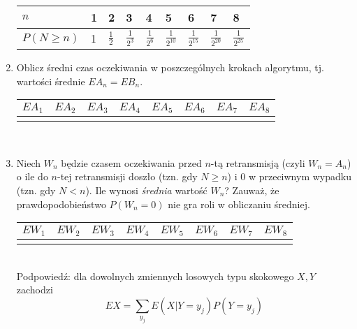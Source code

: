 \documentclass[twoside]{mwart}
\newcommand{\ans}[1]{}
\newcommand{\ans}[1]{\par\emph{Odpowiedź:} #1}
\begin{document}
\begin{enumerate}
{\begin{tabular}{l|p{1.3cm}|p{1.3cm}|p{1.3cm}|p{1.3cm}|p{1.3cm}|p{1.3cm}|p{1.3cm}|p{1.3cm}}
		$n$ & 1 & 2 & 3 & 4 & 5 & 6 & 7 & 8 \\
		\hline
		$P(N\geq n)$ & 1 & $\frac{1}{2}$ & $\frac{1}{2^3}$ & $\frac{1}{2^6}$ & $\frac{1}{2^{10}}$ & $\frac{1}{2^{15}}$ & $\frac{1}{2^{20}}$ & $\frac{1}{2^{25}}$ 
	\end{tabular}
}
\item Oblicz średni czas oczekiwania w poszczególnych krokach algorytmu, tj. wartości średnie $EA_n=EB_n$.
\begin{tabular}{p{1.3cm}|p{1.3cm}|p{1.3cm}|p{1.3cm}|p{1.3cm}|p{1.3cm}|p{1.3cm}|p{1.3cm}}
	$EA_1$ & $EA_2$ & $EA_3$ & $EA_4$ & $EA_5$ & $EA_6$ & $EA_7$ & $EA_8$ \\
	\hline
	& & & & & & & 
\end{tabular}
\vspace{1cm}\\
\ans{\\
	\begin{tabular}{p{1.3cm}|p{1.3cm}|p{1.3cm}|p{1.3cm}|p{1.3cm}|p{1.3cm}|p{1.3cm}|p{1.3cm}}
		$EA_1$ & $EA_2$ & $EA_3$ & $EA_4$ & $EA_5$ & $EA_6$ & $EA_7$ & $EA_8$ \\
		\hline
		$\frac{1}{2}$ & $\frac{3}{2}$ & $\frac{7}{2}$ & $\frac{15}{2}$ & $\frac{31}{2}$ & $\frac{31}{2}$ & $\frac{31}{2}$ & $\frac{31}{2}$ 
	\end{tabular}
}
\item Niech $W_n$ będzie czasem oczekiwania przed $n$-tą retransmisją (czyli $W_n=A_n$) o ile do $n$-tej retransmisji doszło (tzn. gdy $N\geq n$) i $0$ w przeciwnym wypadku (tzn. gdy $N<n$).
Ile wynosi \emph{średnia} wartość $W_n$?
Zauważ, że prawdopodobieństwo $P(W_n=0)$ nie gra roli w obliczaniu średniej.\\
\begin{tabular}{p{1.3cm}|p{1.3cm}|p{1.3cm}|p{1.3cm}|p{1.3cm}|p{1.3cm}|p{1.3cm}|p{1.3cm}}
$EW_1$ & $EW_2$ & $EW_3$ & $EW_4$ & $EW_5$ & $EW_6$ & $EW_7$ & $EW_8$ \\
\hline
 & & & & & & & 
\end{tabular}
\vspace{1cm}\\
Podpowiedź: dla dowolnych zmiennych losowych typu skokowego $X, Y$ zachodzi 
\[EX = \sum_{y_j} E\left(X|Y=y_j\right)P(Y=y_j) \]
\ans{\\
	\[ EW_n = E(W_n|N\geq n)P(N\geq n) + E(W_n|N<n)P(N<n) = EA_nP(N\geq n)\]
	\begin{tabular}{p{1.3cm}|p{1.3cm}|p{1.3cm}|p{1.3cm}|p{1.3cm}|p{1.3cm}|p{1.3cm}|p{1.3cm}}
		$EW_1$ & $EW_2$ & $EW_3$ & $EW_4$ & $EW_5$ & $EW_6$ & $EW_7$ & $EW_8$ \\

\end{tabular}}
\end{enumerate}
\end{document}
